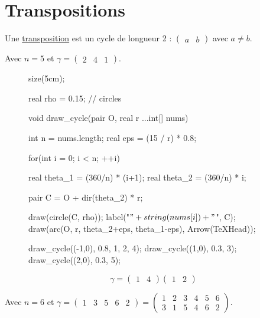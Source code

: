 \part{Transpositions}

\begin{defn}
	Une \underline{transposition} est un cycle de longueur 2 : $\begin{pmatrix}
		a&b
	\end{pmatrix}$ avec $a \neq b$.
\end{defn}

\begin{exm}
	Avec $n = 5$ et $\gamma = \begin{pmatrix}
		2&4&1
	\end{pmatrix}$.

	\begin{figure}[H]
		\centering

		\begin{asy}
			size(5cm);

			real rho = 0.15; // circles

			void draw_cycle(pair O, real r ...int[] nums) {
				int n = nums.length;
				real eps = (15 / r) * 0.8;

				for(int i = 0; i < n; ++i) {
					real theta_1 = (360/n) * (i+1);
					real theta_2 = (360/n) * i;

					pair C = O + dir(theta_2) * r;

					draw(circle(C, rho));
					label("$" + string(nums[i]) + "$", C);
					draw(arc(O, r, theta_2+eps, theta_1-eps), Arrow(TeXHead));
				}
			}

			draw_cycle((-1,0), 0.8, 1, 2, 4);
			draw_cycle((1,0), 0.3, 3);
			draw_cycle((2,0), 0.3, 5);
		\end{asy}
	\end{figure}

	\[
		\gamma = \begin{pmatrix}
			1&4
		\end{pmatrix} \begin{pmatrix}
			1&2
		\end{pmatrix}
	\]

	Avec $n = 6$ et $\gamma = \begin{pmatrix}
		1&3&5&6&2
	\end{pmatrix} = \begin{pmatrix}
		1&2&3&4&5&6\\
		3&1&5&4&6&2
	\end{pmatrix}$.


\end{exm}
